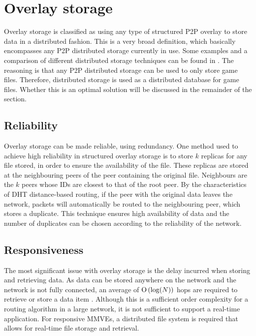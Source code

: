 \section{Overlay storage}
\label{overlay_storage}

Overlay storage is classified as using any type of structured P2P overlay to store data in a distributed fashion. This is a very broad definition, which basically encompasses any P2P distributed storage currently in use. Some examples and a comparison of different distributed storage techniques can be found in \cite{Hasan_distributed_storage_survey}. The reasoning is that any P2P distributed storage can be used to only store game files. Therefore, distributed storage is used as a distributed database for game files. Whether this is an optimal solution will be discussed in the
remainder of the section.

\subsection{Reliability}
\label{overlay_storage_reliability}

Overlay storage can be made reliable, using redundancy. One method used to achieve high reliability in structured overlay storage is to store $k$ replicas for any file stored, in order to ensure the availability of the file. These replicas are stored at the neighbouring peers of the peer containing the original file. Neighbours are the $k$ peers whose IDs are closest to that of the root peer. By the characteristics of DHT distance-based routing, if the peer with the original data leaves the network, packets will automatically be routed to the neighbouring peer, which stores a duplicate. This technique ensures high availability of data and the number of duplicates can be chosen according to the reliability of the
network.


\subsection{Responsiveness}

The most significant issue with overlay storage is the delay incurred when storing and retrieving data. As data can be stored anywhere on the network and the network is not fully connected, an average of $\operatorname{O}\left(\log(N)\right)$ hops are required to retrieve or store a data item \cite{storage_and_chaching_PAST}. Although this is a sufficient order complexity for a routing algorithm in a large network, it is not sufficient to support a real-time application. For responsive MMVEs, a distributed file system is required that allows for real-time file storage and retrieval.

